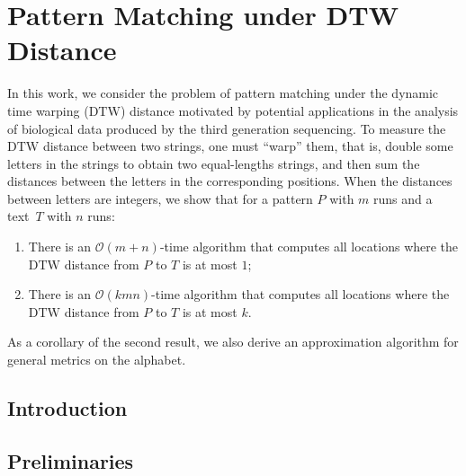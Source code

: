 \chapter{Pattern Matching under DTW Distance}\label{chap:DTW}

\providecommand{\norm}[1]{\ensuremath{\lVert#1\rVert}}
\providecommand{\ceil}[1]{\ensuremath{\lceil#1\rceil}}
\newcommand{\dtw}{\mathrm{DTW}}
\newcommand{\ham}{\mathrm{HAM}}
\providecommand{\dd}{\mathinner{.\,.\allowbreak}}
\providecommand{\RLE}{\mathrm{RLE}}
\providecommand{\Oh}{\mathcal{O}}
\providecommand{\eps}{\varepsilon}
\newcommand{\invacker}{\alpha}

\newcommand{\inputDTW}[1]{}
\newcommand{\figDTW}[2]{\texttt{[image: Part\_Two/dtw/\#2]}}

\begin{small}
In this work, we consider the problem of pattern matching under the dynamic time warping ($\dtw$) distance motivated by potential applications in the analysis of biological data produced by the third generation sequencing. To measure the $\dtw$ distance between two strings, one must ``warp'' them, that is, double some letters in the strings to obtain two equal-lengths strings, and then sum the distances between the letters in the corresponding positions. When the distances between letters are integers, we show that for a pattern $P$ with $m$ runs and a text~$T$ with $n$ runs:
\begin{enumerate}
\item There is an $\Oh(m+n)$-time algorithm that computes all locations where the $\dtw$ distance from $P$ to $T$ is at most $1$;
\item There is an $\Oh(kmn)$-time algorithm that computes all locations where the $\dtw$ distance from $P$ to $T$ is at most $k$.
\end{enumerate}
As a corollary of the second result, we also derive an approximation algorithm for general metrics on the alphabet. 
\end{small}

\section{Introduction}
\inputDTW{intro}

\section{Preliminaries}\label{dtw:sec:prelim}
\inputDTW{prelim}

